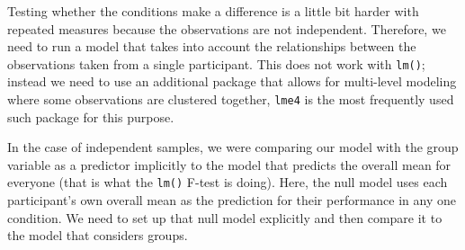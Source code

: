 \documentclass[
]{book}
\newenvironment{Shaded}{\begin{snugshade}}{\end{snugshade}}
\newcommand{\CommentTok}[1]{\textcolor[rgb]{0.56,0.35,0.01}{\textit{#1}}}
\newcommand{\DataTypeTok}[1]{\textcolor[rgb]{0.13,0.29,0.53}{#1}}
\newcommand{\DecValTok}[1]{\textcolor[rgb]{0.00,0.00,0.81}{#1}}
\newcommand{\KeywordTok}[1]{\textcolor[rgb]{0.13,0.29,0.53}{\textbf{#1}}}
\newcommand{\NormalTok}[1]{#1}
\newcommand{\OperatorTok}[1]{\textcolor[rgb]{0.81,0.36,0.00}{\textbf{#1}}}
\newcommand{\StringTok}[1]{\textcolor[rgb]{0.31,0.60,0.02}{#1}}
\begin{document}
Testing whether the conditions make a difference is a little bit harder with repeated measures because the observations are not independent. Therefore, we need to run a model that takes into account the relationships between the observations taken from a single participant. This does not work with \texttt{lm()}; instead we need to use an additional package that allows for multi-level modeling where some observations are clustered together, \texttt{lme4} is the most frequently used such package for this purpose.

In the case of independent samples, we were comparing our model with the group variable as a predictor implicitly to the model that predicts the overall mean for everyone (that is what the \texttt{lm()} F-test is doing). Here, the null model uses each participant's own overall mean as the prediction for their performance in any one condition. We need to set up that null model explicitly and then compare it to the model that considers groups.

\begin{Shaded}
\end{Shaded}
\end{document}
